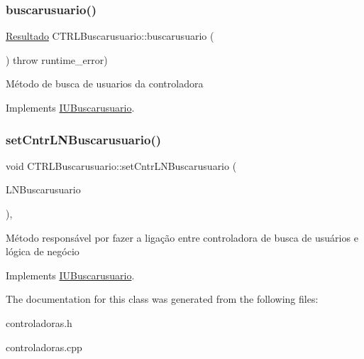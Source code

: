 \subsubsection{\texorpdfstring{buscarusuario()}{buscarusuario()}}
{\footnotesize\ttfamily \hyperlink{classResultado}{Resultado} C\+T\+R\+L\+Buscarusuario\+::buscarusuario (\begin{DoxyParamCaption}{ }\end{DoxyParamCaption}) throw  runtime\+\_\+error) \hspace{0.3cm}{\ttfamily [virtual]}}

Método de busca de usuarios da controladora 

Implements \hyperlink{classIUBuscarusuario}{I\+U\+Buscarusuario}.

\mbox{\label{classCTRLBuscarusuario_afb7a2a586b958579f7a777b3d93da661}} 
\subsubsection{\texorpdfstring{set\+Cntr\+L\+N\+Buscarusuario()}{setCntrLNBuscarusuario()}}
{\footnotesize\ttfamily void C\+T\+R\+L\+Buscarusuario\+::set\+Cntr\+L\+N\+Buscarusuario (\begin{DoxyParamCaption}\item[{\hyperlink{classILNBuscarusuario}{I\+L\+N\+Buscarusuario} $\ast$}]{L\+N\+Buscarusuario }\end{DoxyParamCaption})\hspace{0.3cm}{\ttfamily [inline]}, {\ttfamily [virtual]}}

Método responsável por fazer a ligação entre controladora de busca de usuários e lógica de negócio 

Implements \hyperlink{classIUBuscarusuario}{I\+U\+Buscarusuario}.



The documentation for this class was generated from the following files\+:\begin{DoxyCompactItemize}
\item 
controladoras.\+h\item 
controladoras.\+cpp\end{DoxyCompactItemize}

